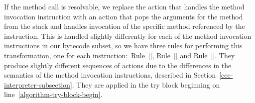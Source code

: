 If the method call is resolvable, we replace the action that handles
the method invocation instruction with an action that pops the
arguments for the method from the stack and handles invocation of the
specific method referenced by the instruction.
This is handled slightly differently for each of the method invocation
instructions in our bytecode subset, so we have three rules for
performing this transformation, one for each
instruction:~Rule~[],
Rule~[] and
Rule~[].
They produce slightly different sequences of actions due to the
differences in the semantics of the method invocation instructions,
described in Section~\ref{cee-interpreter-subsection}.
They are applied in the try block beginning on
line~\ref{algorithm-try-block-begin}.

